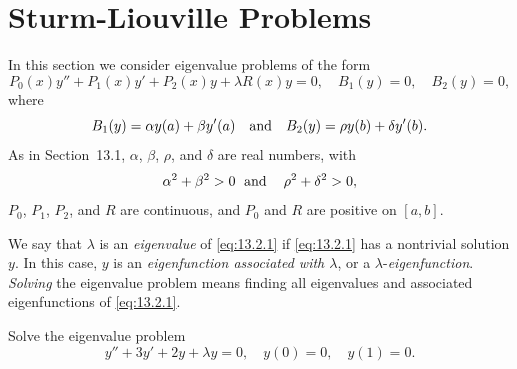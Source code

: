 \section{Sturm-Liouville Problems}

\noindent
In this section we consider eigenvalue problems of the form
\begin{equation}
  \label{eq:13.2.1}P_{0}(x)y''+P_{1}(x)y'+P_{2}(x)y+\lambda R(x)y=0,\quad B_{1}(y)=0,\quad B_{2}(y)=0,
\end{equation}
where
\[
  B_{1}(y)=\alpha y(a)+\beta y'(a)\text{\quad and\quad}B_{2}(y)=\rho y(b)+\delta y'(b).
\]
As in Section~13.1, $\alpha$, $\beta$, $\rho$, and $\delta$ are real numbers, with
\[
  \alpha^{2}+\beta^{2}>0\text{\; and\; \; }\rho^{2}+\delta^{2}>0,
\]
$P_{0}$, $P_{1}$, $P_{2}$, and $R$ are continuous, and $P_{0}$ and $R$ are positive on $[a,b]$.

We say that $\lambda$ is an \emph{eigenvalue} of \eqref{eq:13.2.1} if \eqref{eq:13.2.1} has a
nontrivial solution $y$. In this case, $y$ is an \emph{eigenfunction associated with $\lambda$}, or
a $\lambda$-\emph{eigenfunction}. \emph{Solving} the eigenvalue problem means finding all
eigenvalues and associated eigenfunctions of \eqref{eq:13.2.1}.

\begin{example}
  \label{example:13.2.1} \rm Solve the eigenvalue problem
  \begin{equation}
    \label{eq:13.2.2}y''+3y'+2y+\lambda y=0,\quad y(0)=0,\quad y(1)=0.
  \end{equation}
\end{example}


